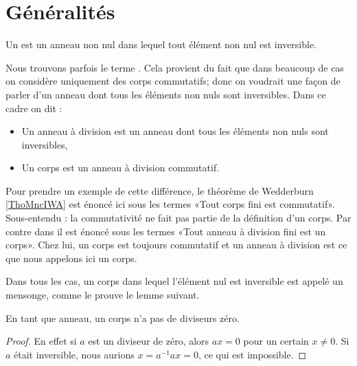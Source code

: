 
\section{Généralités}

\begin{definition}
    Un  est un anneau non nul dans lequel tout élément non nul est inversible.
\end{definition}

\begin{remark}
    Nous trouvons parfois le terme . Cela provient du fait que dans beaucoup de cas on considère uniquement des corps commutatifs; donc on voudrait une façon de parler d'un anneau dont tous les éléments non nuls sont inversibles. Dans ce cadre on dit :
    \begin{itemize}
        \item Un anneau à division est un anneau dont tous les éléments non nuls sont inversibles,
        \item Un corps est un anneau à division commutatif.
    \end{itemize}
    Pour prendre un exemple de cette différence, le théorème de Wedderburn \ref{ThoMncIWA} est énoncé ici sous les termes «Tout corps fini est commutatif». Sous-entendu : la commutativité ne fait pas partie de la définition d'un corps. Par contre dans \cite{KXjFWKA} il est énoncé sous les termes «Tout anneau à division fini est un corps». Chez lui, un corps est toujours commutatif et un anneau à division est ce que nous appelons ici un corps.
    
    Dans tous les cas, un corps dans lequel l'élément nul est inversible est appelé un mensonge, comme le prouve le lemme suivant.
\end{remark}

\begin{lemma}       \label{LemAnnCorpsnonInterdivzer}
    En tant que anneau, un corps n'a pas de diviseurs zéro.
\end{lemma}

\begin{proof}
    En effet si \( a\) est un diviseur de zéro, alors \( ax=0\) pour un certain \( x\neq 0\). Si \( a\) était inversible, nous aurions \( x=a^{-1}ax=0\), ce qui est impossible.
\end{proof}

